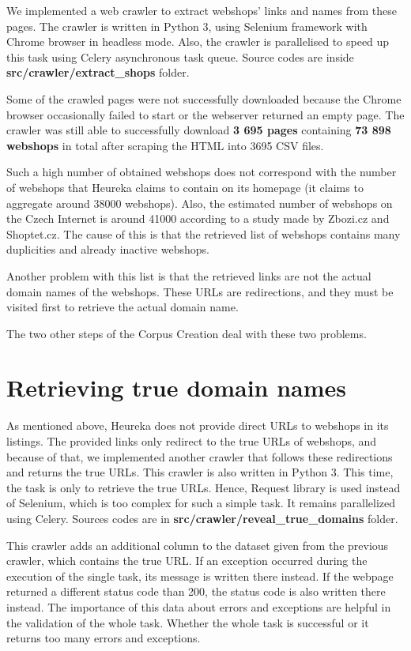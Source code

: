 We implemented a web crawler to extract webshops' links and names from these pages. The crawler is written in Python 3, using Selenium framework with Chrome browser in headless mode. Also, the crawler is parallelised to speed up this task using Celery asynchronous task queue. Source codes are inside \textbf{src\string/crawler\string/extract\_shops} folder. 

Some of the crawled pages were not successfully downloaded because the Chrome browser occasionally failed to start or the webserver returned an empty page. The crawler was still able to successfully download \textbf{3 695 pages} containing \textbf{73 898 webshops} in total after scraping the HTML into 3695 CSV files.

Such a high number of obtained webshops does not correspond with the number of webshops that Heureka claims to contain on its homepage (it claims to aggregate around 38000 webshops). Also, the estimated number of webshops on the Czech Internet is around 41000 according to a study made by Zbozi.cz and Shoptet.cz\cite{srovnavace-shoptet}. The cause of this is that the retrieved list of webshops contains many duplicities and already inactive webshops.

Another problem with this list is that the retrieved links are not the actual domain names of the webshops. These URLs are redirections, and they must be visited first to retrieve the actual domain name.

The two other steps of the Corpus Creation deal with these two problems.

\section{Retrieving true domain names}

As mentioned above, Heureka does not provide direct URLs to webshops in its listings. The provided links only redirect to the true URLs of webshops, and because of that, we implemented another crawler that follows these redirections and returns the true URLs. This crawler is also written in Python 3. This time, the task is only to retrieve the true URLs. Hence, Request library is used instead of Selenium, which is too complex for such a simple task. It remains parallelized using Celery. Sources codes are in \textbf{src\string/crawler\string/reveal\_true\_domains} folder.

This crawler adds an additional column to the dataset given from the previous crawler, which contains the true URL. If an exception occurred during the execution of the single task, its message is written there instead. If the webpage returned a different status code than 200, the status code is also written there instead. The importance of this data about errors and exceptions are helpful in the validation of the whole task. Whether the whole task is successful or it returns too many errors and exceptions.

